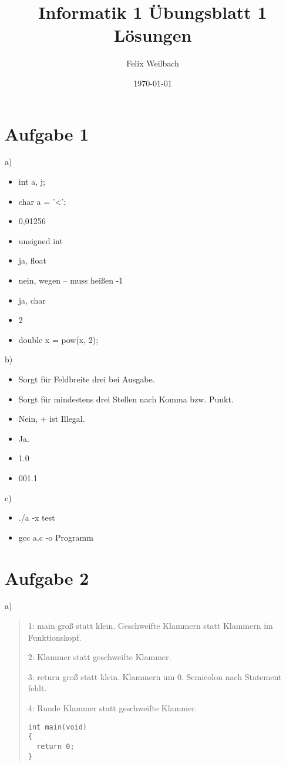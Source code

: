 \documentclass[10pt, a4paper]{article}
\title{Informatik 1 Übungsblatt 1 Lösungen}
\author{Felix Weilbach}
\date{\today}
\begin{document}
\lstset{language=C}
\maketitle

 \section{Aufgabe 1} 
 \label{sec:aufgabe-1}
a) 
\begin {itemize}
  \item int a, j;
  \item char a = '<';
  \item 0,01256
  \item unsigned int
  \item ja, float
  \item nein, wegen -- muss heißen -1
  \item ja, char
  \item 2
  \item double x = pow(x, 2);
\end{itemize}
b)
\begin {itemize}
  \item Sorgt für Feldbreite drei bei Ausgabe.
  \item Sorgt für mindestens drei Stellen nach Komma bzw. Punkt.
  \item Nein, + ist Illegal.
  \item Ja.
  \item 1.0
  \item 001.1
\end{itemize}
c)
\begin {itemize}
  \item  ./a -x test
  \item gcc a.c -o Programm 
\end{itemize}

\section{Aufgabe 2} 
 \label{sec:aufgabe-2}

a)
\begin{quote}
1: main groß statt klein. Geschweifte Klammern statt Klammern im Funktionskopf.

2: Klammer statt geschweifte Klammer.

3: return groß statt klein. Klammern um 0. Semicolon nach Statement fehlt.

4: Runde Klammer statt geschweifte Klammer.

\begin{lstlisting}
int main(void)
{
  return 0;
}
\end{lstlisting}
\end{quote}
\end{document}
